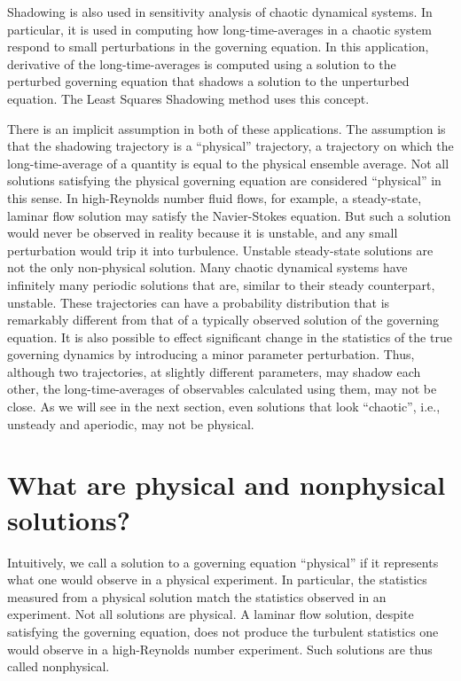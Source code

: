 Shadowing is also used in sensitivity analysis of chaotic dynamical systems.  In particular,
it is used in computing how long-time-averages in a chaotic system
respond to small perturbations in the governing equation. In this application, derivative
of the long-time-averages is computed using a solution to the perturbed governing equation
that shadows a solution to the unperturbed equation.  The Least Squares Shadowing \cite{qiqi-lss} method
uses this concept.

There is an implicit assumption in both of these applications.  The assumption is that
the shadowing trajectory is a ``physical'' trajectory, a trajectory on which
the long-time-average of a quantity is equal to the physical  ensemble average.
Not all solutions satisfying the physical governing equation are considered ``physical''
in this sense.  In high-Reynolds number fluid flows, for example, a steady-state, laminar flow solution may satisfy the Navier-Stokes equation. But such a solution would never be observed in reality because it is unstable, and any small perturbation
would trip it into turbulence. Unstable steady-state solutions are not the only
non-physical solution. Many chaotic dynamical systems have infinitely many periodic
solutions that are, similar to their steady counterpart, unstable. These trajectories can have a probability distribution that is remarkably different from that of a typically observed solution of the governing equation. It is also possible to effect significant change in the statistics of the true governing dynamics by introducing a minor parameter perturbation. Thus, although two trajectories, at slightly different parameters, may shadow each other, the long-time-averages of observables calculated using them, may not be close.    
As we will see
in the next section, even solutions that look ``chaotic'', i.e., unsteady and aperiodic, may not be physical. 

\section{What are physical and nonphysical solutions?}

Intuitively, we call a solution to a governing equation ``physical'' if
it represents what one would observe in a physical experiment.  In particular, the statistics measured from a physical solution match the statistics observed
in an experiment.   Not all solutions are physical.  A laminar flow
solution, despite satisfying the governing equation, does not produce the
turbulent statistics one would observe in a high-Reynolds number experiment. Such solutions are thus called nonphysical.

